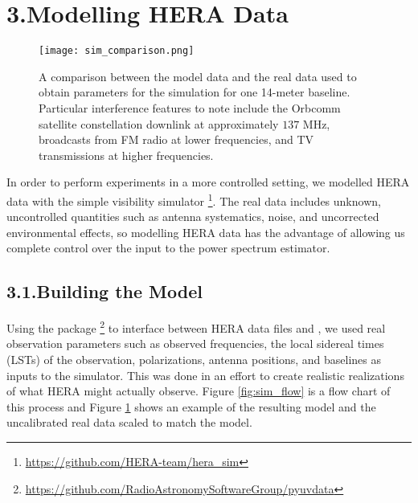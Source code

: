 \documentclass[12pt]{article}
\begin{document}
\tocless\section{\hypertarget{sec:modelling}{3.\hspace{0.75em}Modelling HERA Data}}

\begin{figure}[p]
	\centering
	\texttt{[image: sim\_comparison.png]}
	\caption[Comparison of simulated and real data]{A comparison between the model data and the real data used to obtain parameters for the simulation for one 14-meter baseline. Particular interference features to note include the Orbcomm satellite constellation downlink at approximately $137$ MHz, broadcasts from FM radio at lower frequencies, and TV transmissions at higher frequencies.}
	\label{fig:sim_comparison}
\end{figure}

In order to perform experiments in a more controlled setting, we modelled HERA data with the simple visibility simulator \herasim\footnote{\url{https://github.com/HERA-team/hera_sim}}. The real data includes unknown, uncontrolled quantities such as antenna systematics, noise, and uncorrected environmental effects, so modelling HERA data has the advantage of allowing us complete control over the input to the power spectrum estimator. \vspace{3mm}

\tocless\subsection{\hypertarget{subsec:simdata}{3.1.\hspace{0.75em}Building the Model}}

Using the package \pyuvdata\footnote{\url{https://github.com/RadioAstronomySoftwareGroup/pyuvdata}} \citep{hazelton2017} to interface between HERA data files and \herasim, we used real observation parameters such as observed frequencies, the local sidereal times (LSTs) of the observation, polarizations, antenna positions, and baselines as inputs to the simulator. This was done in an effort to create realistic realizations of what HERA might actually observe. Figure \ref{fig:sim_flow} is a flow chart of this process and Figure \ref{fig:sim_comparison} shows an example of the resulting model and the uncalibrated real data scaled to match the model.
\end{document}
